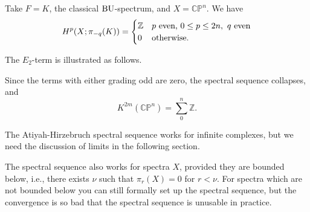 \documentclass[../main]{subfiles}
\begin{document}
\begin{examples}
Take $F=K$, the classical $\mathrm{BU}$-spectrum, and $X=\mathbb{CP}^n$. We have 
\begin{equation*}
    H^p(X;\pi_{-q}(K))=
    \begin{cases}
    \mathbb{Z}&p\text{ even, }0\leq p\leq 2n,\text{ }q\text{ even}\\
    0&\text{otherwise.}
    \end{cases}
\end{equation*}

The $E_2$-term is illustrated as follows.

\begin{center}
\end{center}

Since the terms with either grading odd are zero, the spectral sequence collapses, and 
\begin{equation*}
    K^{2m}(\mathbb{CP}^n)=\sum_{0}^n\mathbb{Z}.
\end{equation*}
\end{examples}
The Atiyah-Hirzebruch spectral sequence works for infinite complexes, but we need the discussion of limits in the following section.

The spectral sequence also works for spectra $X$, provided they are bounded below, i.e., there exists $\nu$ such that $\pi_r(X)=0$ for $r<\nu$. For spectra which are not bounded below you can still formally set up the spectral sequence, but the convergence is so bad that the spectral sequence is unusable in practice.
\end{document}
